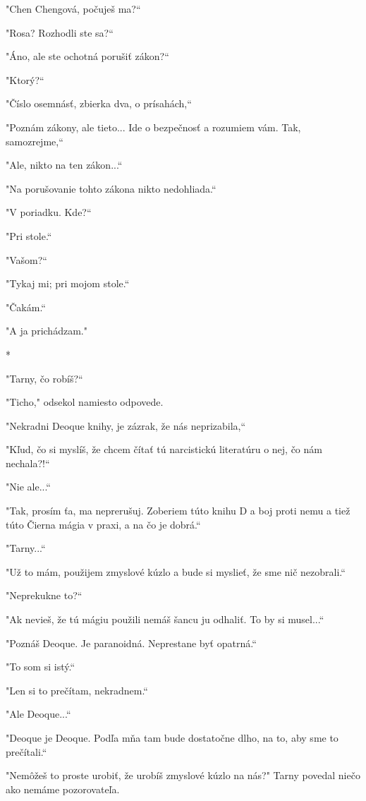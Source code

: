 \documentclass{book}
\begin{document}
"$ $Chen Chengová, počuješ ma?“

"$ $Rosa? Rozhodli ste sa?“

"$ $Áno, ale ste ochotná porušiť zákon?“

"$ $Ktorý?“

"$ $Číslo osemnásť, zbierka dva, o prísahách,“

"$ $Poznám zákony, ale tieto... Ide o bezpečnosť a rozumiem vám. Tak, samozrejme,“

"$ $Ale, nikto na ten zákon...“

"$ $Na porušovanie tohto zákona nikto nedohliada.“

"$ $V poriadku. Kde?“

"$ $Pri stole.“

"$ $Vašom?“

"$ $Tykaj mi; pri mojom stole.“

"$ $Čakám.“

"$ $A ja prichádzam."

\begin{center}
*
\end{center}

"$ $Tarny, čo robíš?“

"$ $Ticho,"$ $ odsekol namiesto odpovede.

"$ $Nekradni Deoque knihy, je zázrak, že nás neprizabila,“

"$ $Kľud, čo si myslíš, že chcem čítať tú narcistickú literatúru o nej, čo nám nechala?!“

"$ $Nie ale...“

"$ $Tak, prosím ťa, ma neprerušuj. Zoberiem túto knihu D a boj proti nemu a tiež túto Čierna mágia v praxi, a na čo je dobrá.“

"$ $Tarny...“

"$ $Už to mám, použijem zmyslové kúzlo a bude si myslieť, že sme nič nezobrali.“

"$ $Neprekukne to?“

"$ $Ak nevieš, že tú mágiu použili nemáš šancu ju odhaliť. To by si musel...“

"$ $Poznáš Deoque. Je paranoidná. Neprestane byť opatrná.“

"$ $To som si istý.“

"$ $Len si to prečítam, nekradnem.“

"$ $Ale Deoque...“

"$ $Deoque je Deoque. Podľa mňa tam bude dostatočne dlho, na to, aby sme to prečítali.“

"$ $Nemôžeš to proste urobiť, že urobíš zmyslové kúzlo na nás?"$ $ Tarny povedal niečo ako nemáme pozorovateľa.
\end{document}
